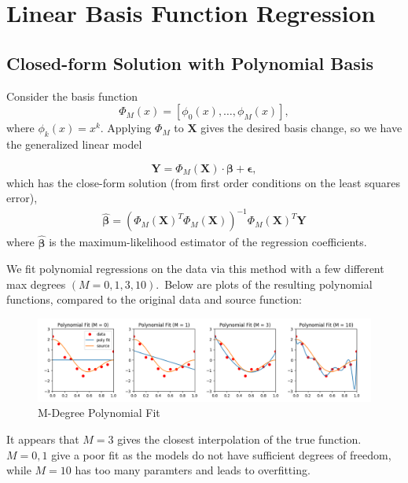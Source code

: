 \documentclass{article}
\begin{document}

\section{Linear Basis Function Regression}

\subsection{Closed-form Solution with Polynomial Basis}
Consider the basis function $$\Phi_M(x) = [\phi_0(x), \dots, \phi_M(x)],$$ where $\phi_k(x) = x^k$. Applying $\Phi_M$ to $\mathbf{X}$ gives the desired basis change, so we have the generalized linear model

$$\mathbf Y = \Phi_M(\mathbf X) \cdot \bm \beta + \bm \epsilon,$$
%
which has the close-form solution (from first order conditions on the least squares error\footnotemark),
%
\begin{align*}
\hat{\bm \beta} = (\Phi_M(\mathbf X)^T \Phi_M(\mathbf X))^{-1} \Phi_M(\mathbf X)^T \mathbf Y
\end{align*}
%
where $\hat{\bm \beta}$ is the maximum-likelihood estimator of the regression coefficients.


We fit polynomial regressions on the data via this method with a few different max degrees $(M = 0, 1, 3, 10)$.\footnotemark\ Below are plots of the resulting polynomial functions, compared to the original data and source function:


\begin{figure}[H]
  \centering
  \includegraphics[width = 6.6in]{../P2/figs/part_1.png}
  \caption{M-Degree Polynomial Fit}
\end{figure}

It appears that $M = 3$ gives the closest interpolation of the true function. $M = 0, 1$ give a poor fit as the models do not have sufficient degrees of freedom, while $M = 10$ has too many paramters and leads to overfitting.
\end{document}
